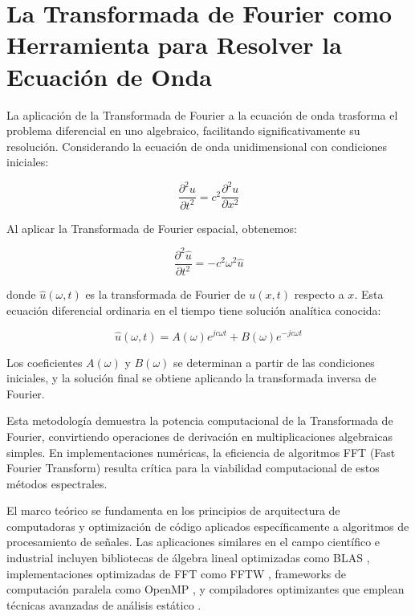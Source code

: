 \documentclass[a4paper]{article}
\begin{document}
\section{La Transformada de Fourier como Herramienta para Resolver la Ecuación de Onda}

La aplicación de la Transformada de Fourier a la ecuación de onda trasforma el problema diferencial en uno algebraico, facilitando significativamente su resolución. Considerando la ecuación de onda unidimensional con condiciones iniciales:

\begin{equation}
\frac{\partial^2 u}{\partial t^2} = c^2 \frac{\partial^2 u}{\partial x^2}
\end{equation}

Al aplicar la Transformada de Fourier espacial, obtenemos:

\begin{equation}
\frac{\partial^2 \hat{u}}{\partial t^2} = -c^2 \omega^2 \hat{u}
\end{equation}

donde $\hat{u}(\omega, t)$ es la transformada de Fourier de $u(x,t)$ respecto a $x$. Esta ecuación diferencial ordinaria en el tiempo tiene solución analítica conocida:

\begin{equation}
\hat{u}(\omega, t) = A(\omega) e^{jc\omega t} + B(\omega) e^{-jc\omega t}
\end{equation}

Los coeficientes $A(\omega)$ y $B(\omega)$ se determinan a partir de las condiciones iniciales, y la solución final se obtiene aplicando la transformada inversa de Fourier.

Esta metodología demuestra la potencia computacional de la Transformada de Fourier, convirtiendo operaciones de derivación en multiplicaciones algebraicas simples. En implementaciones numéricas, la eficiencia de algoritmos FFT (Fast Fourier Transform) resulta crítica para la viabilidad computacional de estos métodos espectrales.

El marco teórico se fundamenta en los principios de arquitectura de computadoras y optimización de código aplicados específicamente a algoritmos de procesamiento de señales. Las aplicaciones similares en el campo científico e industrial incluyen bibliotecas de álgebra lineal optimizadas como BLAS \cite{lawson1979basic}, implementaciones optimizadas de FFT como FFTW \cite{frigo2005design}, frameworks de computación paralela como OpenMP \cite{dagum1998openmp}, y compiladores optimizantes que emplean técnicas avanzadas de análisis estático \cite{muchnick1997advanced}.
\end{document}
